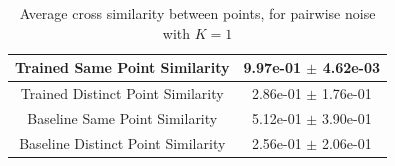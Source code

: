 \documentclass[a4paper]{article}
\begin{document}
\begin{table}[H]
    \centering
    \begin{tabular}{|c|c|} \hline
        Trained Same Point Similarity      & 9.97e-01 $\pm$ 4.62e-03  \\ \hline
        Trained Distinct Point Similarity  & 2.86e-01 $\pm$ 1.76e-01  \\ \hline
        Baseline Same Point Similarity     & 5.12e-01 $\pm$ 3.90e-01  \\ \hline
        Baseline Distinct Point Similarity & 2.56e-01 $\pm$ 2.06e-01  \\ \hline
    \end{tabular}
    \caption{Average cross similarity between points, for pairwise noise with $K=1$}
    \label{tab:pairwise_table}
\end{table}
\end{document}
